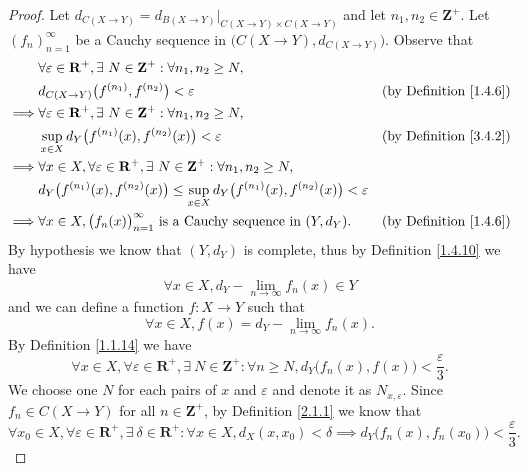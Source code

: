 \begin{proof}
    Let \(d_{C(X \to Y)} = d_{B(X \to Y)}|_{C(X \to Y) \times C(X \to Y)}\) and let \(n_1, n_2 \in \mathbf{Z}^+\).
    Let \((f_n)_{n = 1}^\infty\) be a Cauchy sequence in \(\big(C(X \to Y), d_{C(X \to Y)}\big)\).
    Observe that
    \begin{align*}
                 & \forall \varepsilon \in \mathbf{R}^+, \exists\ N \in \mathbf{Z}^+ : \forall n_1, n_2 \geq N,                                                           \\
                 & d_{C(X \to Y)}\big(f^{(n_1)}, f^{(n_2)}\big) < \varepsilon                                                        & \text{(by Definition \ref{1.4.6})} \\
        \implies & \forall \varepsilon \in \mathbf{R}^+, \exists\ N \in \mathbf{Z}^+ : \forall n_1, n_2 \geq N,                                                           \\
                 & \sup_{x \in X} d_Y\big(f^{(n_1)}(x), f^{(n_2)}(x)\big) < \varepsilon                                              & \text{(by Definition \ref{3.4.2})} \\
        \implies & \forall x \in X, \forall \varepsilon \in \mathbf{R}^+, \exists\ N \in \mathbf{Z}^+ : \forall n_1, n_2 \geq N,                                          \\
                 & d_Y\big(f^{(n_1)}(x), f^{(n_2)}(x)\big) \leq \sup_{x \in X} d_Y\big(f^{(n_1)}(x), f^{(n_2)}(x)\big) < \varepsilon                                      \\
        \implies & \forall x \in X, \big(f_n(x)\big)_{n = 1}^\infty \text{ is a Cauchy sequence in } (Y, d_Y).                       & \text{(by Definition \ref{1.4.6})}
    \end{align*}
    By hypothesis we know that \((Y, d_Y)\) is complete, thus by Definition \ref{1.4.10} we have
    \[
        \forall x \in X, d_Y - \lim_{n \to \infty} f_n(x) \in Y
    \]
    and we can define a function \(f : X \to Y\) such that
    \[
        \forall x \in X, f(x) = d_Y - \lim_{n \to \infty} f_n(x).
    \]
    By Definition \ref{1.1.14} we have
    \[
        \forall x \in X, \forall \varepsilon \in \mathbf{R}^+, \exists\ N \in \mathbf{Z}^+ : \forall n \geq N, d_Y\big(f_n(x), f(x)\big) < \frac{\varepsilon}{3}.
    \]
    We choose one \(N\) for each pairs of \(x\) and \(\varepsilon\) and denote it as \(N_{x, \varepsilon}\).
    Since \(f_n \in C(X \to Y)\) for all \(n \in \mathbf{Z}^+\), by Definition \ref{2.1.1} we know that
    \[
        \forall x_0 \in X, \forall \varepsilon \in \mathbf{R}^+, \exists\ \delta \in \mathbf{R}^+ : \forall x \in X, d_X(x, x_0) < \delta \implies d_Y\big(f_n(x), f_n(x_0)\big) < \frac{\varepsilon}{3}.
\]
\end{proof}
